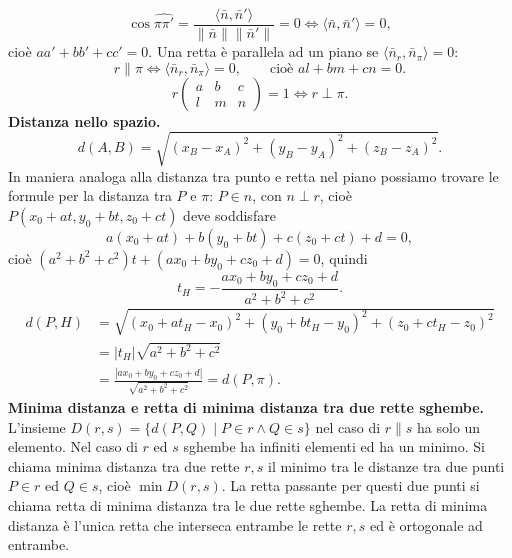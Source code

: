\documentclass[11pt,a4paper]{article}
\newcommand{\pagina}[1]{\clearpage}
\begin{document}
\pagina{67}
\[\cos\widehat{\pi\pi'}=\frac{\langle\bar n,\bar n'\rangle}{\|\bar n\|\|\bar n'\|}=0\Longleftrightarrow\langle\bar n,\bar n'\rangle=0,\]
cioè $aa'+bb'+cc'=0$.
Una retta è parallela ad un piano se $\langle\bar n_r,\bar n_\pi\rangle=0$:
\[r\parallel\pi\Longleftrightarrow\langle\bar n_r,\bar n_\pi\rangle=0,\qquad\text{cioè }al+bm+cn=0.\]
\[r\begin{pmatrix}a&b&c\\l&m&n\end{pmatrix}=1\Longleftrightarrow r\perp\pi.\]
\textbf{Distanza nello spazio.}
\[d(A,B)=\sqrt{(x_B-x_A)^2+(y_B-y_A)^2+(z_B-z_A)^2}.\]
In maniera analoga alla distanza tra punto e retta nel piano possiamo trovare le formule per la distanza tra $P$ e $\pi$:
$P\in n$, con $n\perp r$, cioè $P(x_0+at,y_0+bt,z_0+ct)$ deve soddisfare
\[a(x_0+at)+b(y_0+bt)+c(z_0+ct)+d=0,\]
cioè $(a^2+b^2+c^2)t+(ax_0+by_0+cz_0+d)=0$, quindi
\[t_H=-\frac{ax_0+by_0+cz_0+d}{a^2+b^2+c^2}.\]
\begin{align*}
d(P,H)&=\sqrt{(x_0+at_H-x_0)^2+(y_0+bt_H-y_0)^2+(z_0+ct_H-z_0)^2}\\
&=|t_H|\sqrt{a^2+b^2+c^2}\\
&=\frac{|ax_0+by_0+cz_0+d|}{\sqrt{a^2+b^2+c^2}}=d(P,\pi).
\end{align*}
\pagina{68}
\textbf{Minima distanza e retta di minima distanza tra due rette sghembe.}
L'insieme $D(r,s)=\{d(P,Q)\mid P\in r\land Q\in s\}$ nel caso di $r\parallel s$ ha solo un elemento.
Nel caso di $r$ ed $s$ sghembe ha infiniti elementi ed ha un minimo.
Si chiama minima distanza tra due rette $r,s$ il minimo tra le distanze tra due punti $P\in r$ ed $Q\in s$, cioè $\min D(r,s)$.
La retta passante per questi due punti si chiama retta di minima distanza tra le due rette sghembe.
La retta di minima distanza è l'unica retta che interseca entrambe le rette $r,s$ ed è ortogonale ad entrambe.
\end{document}
